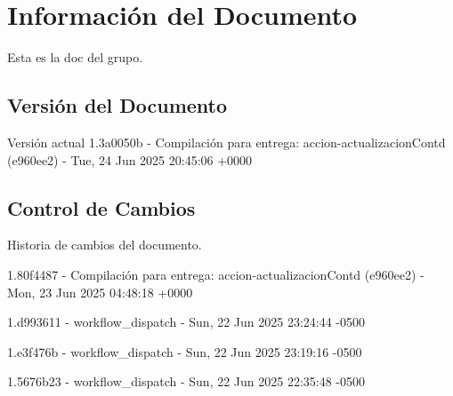 \documentclass[
	a4paper, %
	12pt, %
]{include/CSSullivanBusinessReport}
\begin{document}
\newpage

\begin{twothirdswidth} %
	\tableofcontents %
\end{twothirdswidth}

\newpage


\newpage

\section{Información del
Documento}\label{sec:informaciuxf3n-del-documento}

Esta es la doc del grupo.

\subsection{Versión del Documento}\label{sec:versiuxf3n-del-documento}

\begin{quote}
\end{quote}

Versión actual 1.3a0050b - Compilación para entrega:
accion-actualizacionContd (e960ee2) - Tue, 24 Jun 2025 20:45:06 +0000

\subsection{Control de Cambios}\label{sec:control-de-cambios}

Historia de cambios del documento.

1.80f4487 - Compilación para entrega: accion-actualizacionContd
(e960ee2) - Mon, 23 Jun 2025 04:48:18 +0000

1.d993611 - workflow\_dispatch - Sun, 22 Jun 2025 23:24:44 -0500

1.e3f476b - workflow\_dispatch - Sun, 22 Jun 2025 23:19:16 -0500

1.5676b23 - workflow\_dispatch - Sun, 22 Jun 2025 22:35:48 -0500
\end{document}
